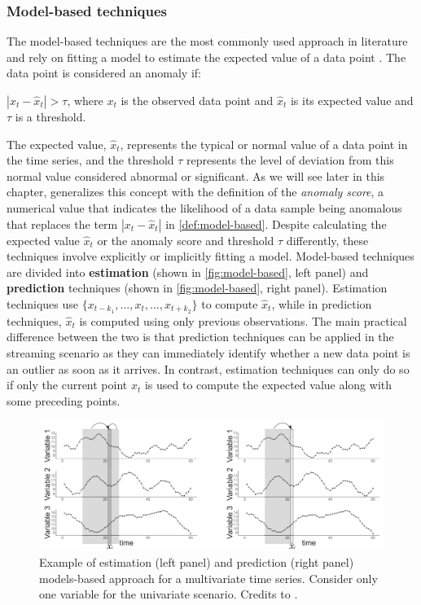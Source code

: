 \subsubsection{Model-based techniques}
\label{ss:model-based}
The model-based techniques are the most commonly used approach in literature and rely on fitting a model to estimate the expected value of a data point \cite{blazquez2020review}. The data point is considered an anomaly if: 
\begin{definition}\label{def:model-based}
    $|x_t - \hat{x}_t| > \tau $, where $x_t$ is the observed data point and $\hat{x}_t$ is its expected value and $\tau$ is a threshold.
\end{definition}
The expected value, $\hat{x}_t$, represents the typical or normal value of a data point in the time series, and the threshold $\tau$ represents the level of deviation from this normal value considered abnormal or significant. As we will see later in this chapter, \cite{choi2021deep} generalizes this concept with the definition of the \textit{anomaly score}, a numerical value that indicates the likelihood of a data sample being anomalous that replaces the term $|x_t - \hat{x}_t|$ in \autoref{def:model-based}. Despite calculating the expected value $\hat{x}_t$ or the anomaly score and threshold $\tau$ differently, these techniques involve explicitly or implicitly fitting a model. Model-based techniques are divided into \textbf{estimation} (shown in \autoref{fig:model-based}, left panel) and \textbf{prediction} techniques (shown in \autoref{fig:model-based}, right panel). Estimation techniques use $\{x_{t-k_1},...,x_t,...,x_{t+k_2}\}$ to compute $\hat{x}_t$, while in prediction techniques, $\hat{x}_t$ is computed using only previous observations. The main practical difference between the two is that prediction techniques can be applied in the streaming scenario as they can immediately identify whether a new data point is an outlier as soon as it arrives. In contrast, estimation techniques can only do so if only the current point $x_t$ is used to compute the expected value along with some preceding points. 
\begin{figure}[t]
\centering
\includegraphics[width=1\linewidth]{figures/introduction-2/model-based.png}
\caption{Example of estimation (left panel) and prediction (right panel) models-based approach for a multivariate time series. Consider only one variable for the univariate scenario. Credits to \cite{blazquez2020review}.}
\label{fig:model-based}
\end{figure}


